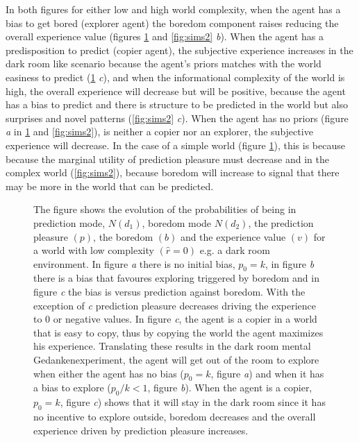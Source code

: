 \documentclass[11pt, onecolumn]{article}
\begin{document}
In both figures for either low and high world complexity, when the agent has a bias to get bored (explorer agent) the boredom component raises reducing the overall experience value (figures \ref{fig:sims1} and \ref{fig:sims2} \emph{b}). When the agent has a predisposition to predict (copier agent), the subjective experience increases in the dark room like scenario because the agent's priors matches with the world easiness to predict (\ref{fig:sims1} \emph{c}), and when the informational complexity of the world is high, the overall experience will decrease but will be positive, because the agent has a bias to predict and there is structure to be predicted in the world but also surprises and novel patterns (\ref{fig:sims2} \emph{c}). When the agent has no priors (figure \emph{a} in \ref{fig:sims1} and \ref{fig:sims2}), is neither a copier nor an explorer, the subjective experience will decrease. In the case of a simple world (figure \ref{fig:sims1}), this is because because the marginal utility of prediction pleasure must decrease and in the complex world (\ref{fig:sims2}), because boredom will increase to signal that there may be more in the world that can be predicted.

\begin{figure}[H]
    \hfill
    \hfill
    \caption{The figure shows the evolution of the probabilities of being in prediction mode, $N(d_1)$, boredom mode $N(d_2)$, the prediction pleasure $(p)$, the boredom $(b)$ and the experience value $(v)$ for a world with low complexity $(\hat{r} = 0)$ e.g. a dark room environment. In figure \emph{a} there is no initial bias, $p_0 = k$, in figure \emph{b} there is a bias that favoures exploring  triggered by boredom and in figure \emph{c} the bias is versus prediction against boredom. With the exception of \emph{c} prediction pleasure decreases driving the experience to 0 or negative values. In figure \emph{c}, the agent is a copier in a world that is easy to copy, thus by copying the world the agent maximizes his experience. Translating these results in the dark room mental Gedankenexperiment, the agent will get out of the room to explore when either the agent has no bias ($p_0 = k$, figure \emph{a}) and when it has a bias to explore ($p_0/k < 1$, figure \emph{b}). When the agent is a copier, $p_0 = k$, figure \emph{c}) shows that it will stay in the dark room since it has no incentive to explore outside, boredom decreases and the overall experience driven by prediction pleasure increases.}
    \label{fig:sims1}
\end{figure}
\end{document}
